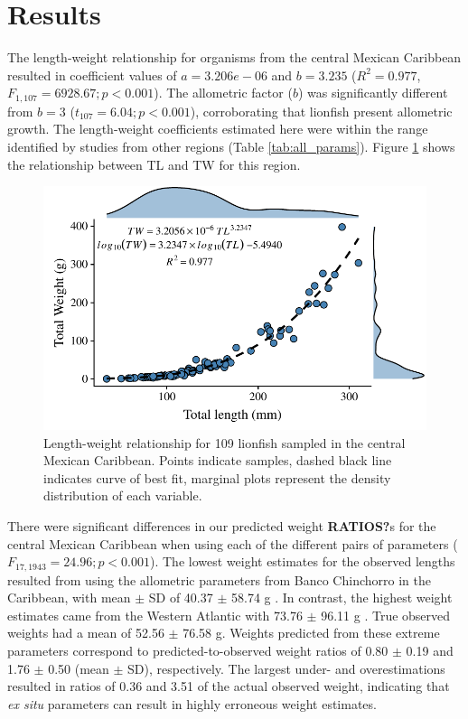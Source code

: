 \documentclass[fleqn,10pt,lineno]{wlpeerj} %
\begin{document}
\section*{Results}

The length-weight relationship for organisms from the central Mexican
Caribbean resulted in coefficient values of \(a = 3.206e-06\) and
\(b = 3.235\) (\(R^2 = 0.977\), \(F_{1, 107} = 6928.67; p < 0.001\)).
The allometric factor (\(b\)) was significantly different from \(b = 3\)
(\(t_{107} = 6.04; p<0.001\)), corroborating that lionfish present
allometric growth. The length-weight coefficients estimated here were
within the range identified by studies from other regions (Table
\ref{tab:all_params}). Figure \ref{fig:l-w-carib} shows the relationship
between TL and TW for this region.

\begin{figure}
\centering
\includegraphics{Manuscript_files/figure-latex/fit1-1.pdf}
\caption{\label{fig:l-w-carib}Length-weight relationship for 109
lionfish sampled in the central Mexican Caribbean. Points indicate
samples, dashed black line indicates curve of best fit, marginal plots
represent the density distribution of each variable.}
\end{figure}

There were significant differences in our predicted weight
\textbf{RATIOS?}s for the central Mexican Caribbean when using each of
the different pairs of parameters (\(F_{17, 1943} = 24.96; p < 0.001\)).
The lowest weight estimates for the observed lengths resulted from using
the allometric parameters from Banco Chinchorro in the Caribbean, with
mean \(\pm\) SD of 40.37 \(\pm\) 58.74 g \citep{sabidoitz_2016}. In
contrast, the highest weight estimates came from the Western Atlantic
with 73.76 \(\pm\) 96.11 g \citep{barbour_2011}. True observed weights
had a mean of 52.56 \(\pm\) 76.58 g. Weights predicted from these
extreme parameters correspond to predicted-to-observed weight ratios of
0.80 \(\pm\) 0.19 and 1.76 \(\pm\) 0.50 (mean \(\pm\) SD), respectively.
The largest under- and overestimations resulted in ratios of 0.36 and
3.51 of the actual observed weight, indicating that \emph{ex situ}
parameters can result in highly erroneous weight estimates.
\end{document}
